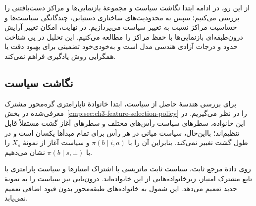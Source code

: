 از این رو، در ادامه ابتدا نگاشت سیاست و
مجموعهٔ بازنمایی‌ها و مراکز دست‌یافتنی را
بررسی می‌کنیم؛ سپس به محدودیت‌های ساختاری
دستیابی، چندگانگی سیاست‌ها و حساسیت مراکز
نسبت به تغییر سیاست می‌پردازیم. در نهایت،
امکان تغییر آرایش درون‌طبقه‌ای بازنمایی‌ها
با حفظ مراکز را مطالعه می‌کنیم. این تحلیل
در پی شناخت حدود و درجات آزادی هندسی
مدل است و به‌خودی‌خود تضمینی برای بهبود
دقت یا همگرایی روش یادگیری فراهم نمی‌کند.

\subsection{نگاشت سیاست}
\label{cmp:subsec:ch3-policy-geometry-map}

برای بررسی هندسهٔ حاصل از سیاست، ابتدا خانوادهٔ ناپارامتری گره‌محور مشترک معرفی‌شده در بخش~\ref{cmp:sec:ch3-feature-selection-policy} را در نظر می‌گیریم. در این خانواده، سطرهای سیاست رأس‌های مختلف و سطرهای آغاز گشت مستقلاً قابل تنظیم‌اند؛ بااین‌حال، سیاست میانی در هر رأس برای تمام مبدأها یکسان است و در طول گشت تغییر نمی‌کند. بنابراین آن را با $\pi(b\mid i,a)$ و سیاست آغاز از نمونهٔ $X_s$ را با $\pi(b\mid s,\bot)$ نشان می‌دهیم.

روی دادهٔ مرجع ثابت، سیاست ثابت ماتریسی با اشتراک امتیازها و سیاست پارامتری با تابع مشترک امتیاز، زیرخانواده‌هایی از این خانواده‌اند. درون‌یابی نیز سیاست را به نمونهٔ جدید تعمیم می‌دهد. این شمول به خانواده‌های طبقه‌محور بدون قیود اضافی تعمیم نمی‌یابد.

